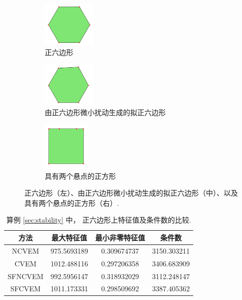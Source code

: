 \begin{figure}[htbp]
\centering
\begin{subfigure}[t]{0.3\linewidth}
    \centering
    \includegraphics[width=1in]{./figures/stabfree/hexagon0.pdf}
    \caption{正六边形}
    \label{fig:hexagon0}
\end{subfigure}%
\hspace{0.5cm} %
\begin{subfigure}[t]{0.3\linewidth}
    \centering
    \includegraphics[width=1in]{./figures/stabfree/hexagon1.pdf}
    \caption{由正六边形微小扰动生成的拟正六边形}
    \label{fig:hexagon1}
\end{subfigure}%
\hspace{0.5cm} %
\begin{subfigure}[t]{0.3\linewidth}
    \centering
    \includegraphics[width=0.9in]{./figures/stabfree/hexagon2.pdf}
    \caption{具有两个悬点的正方形}
    \label{fig:hexagon2}
\end{subfigure}
\caption{正六边形（左）、由正六边形微小扰动生成的拟正六边形（中）、以及具有两个悬点的正方形（右）.}
\label{fig:hexagon}
\end{figure}


\begin{table}[htbp]
\centering
\caption{算例 \ref{sec:stability} 中，
正六边形上特征值及条件数的比较.}
\label{tab:comparison0}
\begin{tabular}{c|c c c}
\hline
\textbf{方法} & \textbf{最大特征值} & \textbf{最小非零特征值} & \textbf{条件数} \\\hline
NCVEM  & 975.5693189 & 0.309674737 & 3150.303211 \\\hline
CVEM   & 1012.488116 & 0.297206358 & 3406.683909 \\\hline
SFNCVEM & 992.5956147 & 0.318932029 & 3112.248147 \\\hline
SFCVEM  & 1011.173331 & 0.298509692 & 3387.405362 \\\hline
\end{tabular}
\end{table} 

